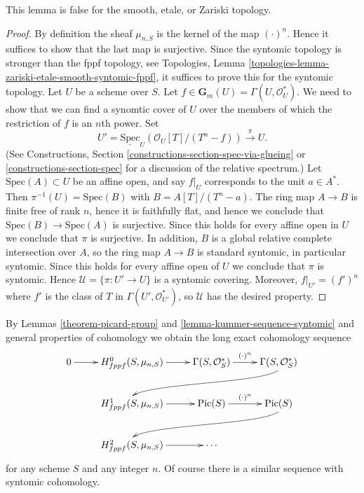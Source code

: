\begin{remark}
\label{remark-no-kummer-sequence-smooth-etale-zariski}
This lemma is false for the smooth, etale, or Zariski topology.
\end{remark}

\begin{proof}
By definition the sheaf $\mu_{n, S}$ is the kernel of the map
$(\cdot)^n$. Hence it suffices to show that the last map is surjective.
Since the syntomic topology is stronger than the fppf topology, see
Topologies, Lemma \ref{topologies-lemma-zariski-etale-smooth-syntomic-fppf},
it suffices to prove this for the syntomic topology.
Let $U$ be a scheme over $S$. Let
$f \in \mathbf{G}_m(U) = \Gamma(U, \mathcal{O}_U^*)$.
We need to show that we can find a synomtic cover of
$U$ over the members of which the restriction of $f$ is an $n$th power.
Set
$$
U' =
\underline{\text{Spec}}_U(\mathcal{O}_U[T]/(T^n-f))
\xrightarrow{\pi}
U.
$$
(See
Constructions, Section \ref{constructions-section-spec-via-glueing} or
\ref{constructions-section-spec}
for a discussion of the relative spectrum.)
Let $\text{Spec}(A) \subset U$ be an affine open, and say $f|_U$ corresponds
to the unit $a \in A^*$. Then $\pi^{-1}(U) = \text{Spec}(B)$ with
$B = A[T]/(T^n - a)$. The ring map $A \to B$ is finite free of rank $n$,
hence it is faithfully flat, and hence we conclude that
$\text{Spec}(B) \to \text{Spec}(A)$ is surjective. Since this holds for every
affine open in $U$ we conclude that $\pi$ is surjective.
In addition, $B$ is a global relative complete intersection over $A$, so
the ring map $A \to B$ is standard syntomic,
in particular syntomic. Since this holds for every affine open of $U$
we conclude that $\pi$ is syntomic. Hence
$\mathcal{U} = \{\pi : U' \to U\}$ is a syntomic covering.
Moreover, $f|_{U'} = (f')^n$ where $f'$ is the class of $T$
in $\Gamma(U', \mathcal{O}_{U'}^*)$, so $\mathcal{U}$ has the desired property.
\end{proof}

\noindent
By Lemmas \ref{theorem-picard-group} and \ref{lemma-kummer-sequence-syntomic}
and general properties of cohomology we obtain
the long exact cohomology sequence
$$
\xymatrix{
0 \ar[r] &
H_{fppf}^0(S, \mu_{n, S}) \ar[r] &
\Gamma(S, \mathcal{O}_S^*) \ar^{(\cdot)^n}[r] &
\Gamma(S, \mathcal{O}_S^*) \ar@(rd,ul)[rdllllr]
\\
& H_{fppf}^1(S, \mu_{n, S}) \ar[r] &
\text{Pic}(S) \ar^{(\cdot)^n}[r] &
\text{Pic} (S) \ar@(rd,ul)[rdllllr] \\
& H_{fppf}^2(S, \mu_{n, S}) \ar[r] &
\cdots
}
$$
for any scheme $S$ and any integer $n$. Of course there is a similar sequence
with syntomic cohomology.


